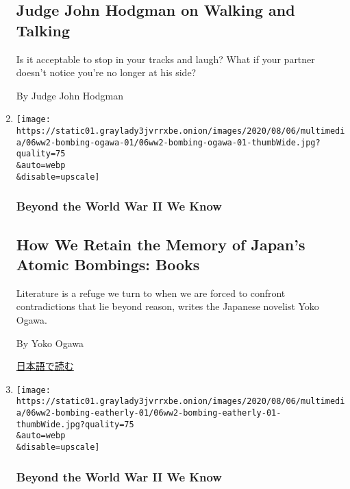 \begin{enumerate}
  \hypertarget{judge-john-hodgman-on-walking-and-talking}{%
  \subsection{Judge John Hodgman on Walking and
  Talking}\label{judge-john-hodgman-on-walking-and-talking}}

  Is it acceptable to stop in your tracks and laugh? What if your
  partner doesn't notice you're no longer at his side?

  By Judge John Hodgman
\item
  \href{/2020/08/06/magazine/hiroshima-nagasaki-japan-literature.html}{}

  \texttt{[image: https://static01.graylady3jvrrxbe.onion/images/2020/08/06/multimedia/06ww2-bombing-ogawa-01/06ww2-bombing-ogawa-01-thumbWide.jpg?quality=75\\\&auto=webp\\\&disable=upscale]}

  \hypertarget{beyond-the-world-war-ii-we-know}{%
  \subsubsection{Beyond the World War II We
  Know}\label{beyond-the-world-war-ii-we-know}}

  \hypertarget{how-we-retain-the-memory-of-japans-atomic-bombings-books}{%
  \subsection{How We Retain the Memory of Japan's Atomic Bombings:
  Books}\label{how-we-retain-the-memory-of-japans-atomic-bombings-books}}

  Literature is a refuge we turn to when we are forced to confront
  contradictions that lie beyond reason, writes the Japanese novelist
  Yoko Ogawa.

  By Yoko Ogawa

  \href{https://www.nytimes3xbfgragh.onion/ja/2020/08/06/magazine/atomic-bombings-japan-books-hiroshima-nagasaki.html}{日本語で読む}
\item
  \href{/2020/08/06/magazine/hiroshima-claude-eatherly-antinuclear.html}{}

  \texttt{[image: https://static01.graylady3jvrrxbe.onion/images/2020/08/06/multimedia/06ww2-bombing-eatherly-01/06ww2-bombing-eatherly-01-thumbWide.jpg?quality=75\\\&auto=webp\\\&disable=upscale]}

  \hypertarget{beyond-the-world-war-ii-we-know-1}{%
  \subsubsection{Beyond the World War II We
  Know}\label{beyond-the-world-war-ii-we-know-1}}


\end{enumerate}
